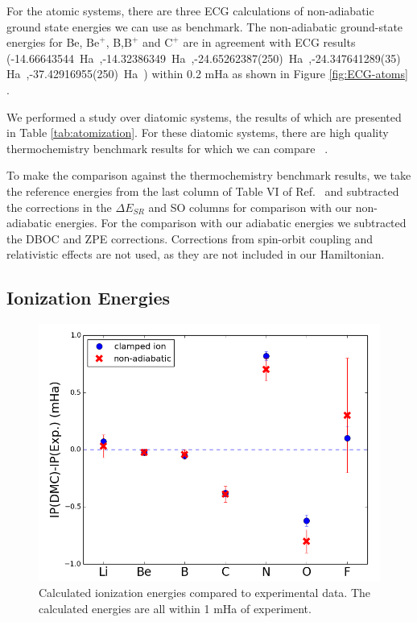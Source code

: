 \documentclass[pra,superscriptaddress,groupedaddress,twocolumn]{revtex4}
\begin{document}
For the atomic systems, there are three ECG calculations of non-adiabatic ground state energies we can use as benchmark. The non-adiabatic ground-state energies for Be, $\text{Be}^+$, B,$\text{B}^+$ and $\text{C}^+$ are in agreement with ECG results (-14.66643544~Ha~\cite{Bubin_BeH_noBO},-14.32386349~Ha~\cite{Bubin_BeH_noBO},-24.65262387(250)~Ha~\cite{Bubin_B},-24.347641289(35)~Ha~\cite{Bubin_B+},-37.42916955(250)~Ha~\cite{Bubin_C+}) within 0.2 mHa as shown in Figure \ref{fig:ECG-atoms} .

We performed a study over diatomic systems, the results of which are presented in Table \ref{tab:atomization}. For these diatomic systems, there are high quality thermochemistry benchmark results for which we can compare ~\cite{Feller_Corrections}. 

To make the comparison against the thermochemistry benchmark results, we take the reference energies from the last column of Table VI of Ref.~\cite{Feller_Corrections} and subtracted the corrections in the $\Delta E_{SR}$ and SO columns for comparison with our non-adiabatic energies.  For the comparison with our adiabatic energies we subtracted the DBOC and ZPE corrections.  Corrections from spin-orbit coupling and relativistic effects are not used, as they are not included in our Hamiltonian.

\subsection{Ionization Energies}

\begin{figure}[h]
\centering
\includegraphics[scale=.4]{Figures/ionization}
\caption{Calculated ionization energies compared to experimental data. The calculated energies are all within 1 mHa of experiment.}
\end{figure}
\end{document}
